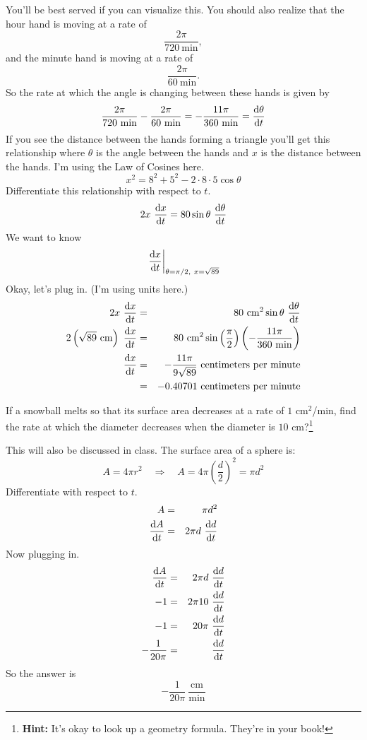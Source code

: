 \documentclass[12pt,addpoints, answers, fleqn]{exam}
\begin{document}
\begin{questions}
\begin{solution}
You'll be best served if you can visualize this. You should also realize that the hour hand is moving at a rate of
\[
\frac{2\pi}{720 \ \mbox{min}},
\]
and the minute hand is moving at a rate of
\[
\frac{2\pi}{60 \ \mbox{min}}.
\]
So the rate at which the angle is changing between these hands is given by
\[
\frac{2\pi}{720 \ \mbox{min}} - \frac{2\pi}{60 \ \mbox{min}} = - \frac{11\pi}{360 \ \mbox{min}} = \frac{{\rm{d}} \theta}{{\rm{d}} t}
\]
If you see the distance between the hands forming a triangle you'll get this relationship where $\theta$ is the angle between the hands and $x$ is the distance between the hands. I'm using the Law of Cosines here.
\[
x^2  = 8^2 + 5^2 - 2 \cdot 8 \cdot 5 \cos \theta
\]
Differentiate this relationship with respect to $t$.
\[
2x  \  \frac{{\rm{d}} x}{{\rm{d}} t} = 80 \sin \theta \ \frac{{\rm{d}}  \theta}{{\rm{d}} t}
\]
We want to know
\[
\left . \frac{{\rm{d}} x}{{\rm{d}} t}  \right|_{\theta = \pi/2, \ x = \sqrt{89}}
\]
Okay, let's plug in. (I'm using units here.)
\begin{eqnarray*}
2x   \ \frac{{\rm{d}} x}{{\rm{d}} t} &=& 80 \ \mbox{cm}^2 \sin \theta \ \frac{{\rm{d}} \theta}{{\rm{d}} t}\\
2 \left(   \sqrt{89} \ \mbox{cm} \right)  \ \frac{{\rm{d}} x}{{\rm{d}} t} &=& 80 \  \mbox{cm}^2  \sin \left( \frac{\pi}{2} \right) \left( - \frac{11\pi}{360 \ \mbox{min}} \right)\\
\frac{{\rm{d}} x}{{\rm{d}} t} &=& - \frac{11\pi}{9\sqrt{89}} \ \mbox{centimeters per minute}\\
&=& - 0.40701 \ \mbox{centimeters per minute}
\end{eqnarray*}

\end{solution}

\question If a snowball melts so that its surface area decreases at a rate of $1$ cm$^2$/min, find the rate at which the diameter decreases when the diameter is $10$ cm?\footnote{\textbf{Hint:} It's okay to look up a geometry formula. They're in your book!}
\begin{solution}
This will also be discussed in class. The surface area of a sphere is:
\[
A = 4 \pi r^2 \quad \Rightarrow \quad A = 4 \pi \left( \frac{d}{2} \right)^2 = \pi d^2
\]
Differentiate with respect to $t$.
\begin{eqnarray*}
A &=& \pi d^2\\
\frac{{\rm{d}}A}{{\rm{d}}t}  &=& 2\pi d \ \frac{{\rm{d}}d}{{\rm{d}}t}
\end{eqnarray*}
Now plugging in.
\begin{eqnarray*}
\frac{{\rm{d}}A}{{\rm{d}}t}  &=& 2\pi d \ \frac{{\rm{d}}d}{{\rm{d}}t}\\
-1  &=& 2\pi 10 \ \frac{{\rm{d}}d}{{\rm{d}}t}\\
-1  &=& 20\pi \ \frac{{\rm{d}}d}{{\rm{d}}t}\\
-\frac{1}{20 \pi}  &=&  \frac{{\rm{d}}d}{{\rm{d}}t}
\end{eqnarray*}
So the answer is
\[
-\frac{1}{20 \pi} \ \frac{\mbox{cm}}{\mbox{min}}
\]
\end{solution}




\end{questions}
\end{document}
